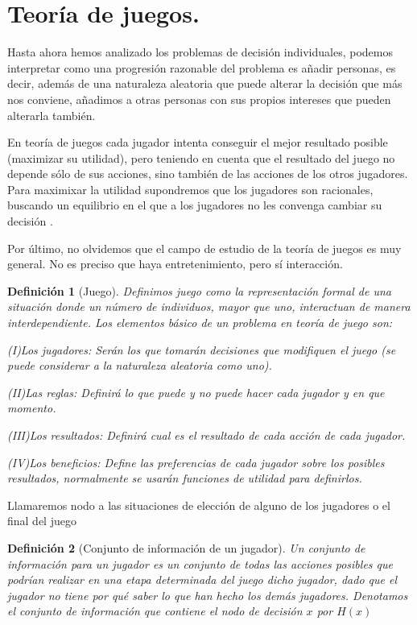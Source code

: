 \documentclass[a4paper]{report} %
\newtheorem{definicion}{Definición}[section]
\begin{document}
\section{Teoría de juegos.}


Hasta ahora hemos analizado los problemas de decisión individuales, podemos interpretar como una progresión razonable del problema es añadir personas, es decir, además de una naturaleza aleatoria que puede alterar la decisión que más nos conviene, añadimos a otras personas con sus propios intereses que pueden alterarla también.

En teoría de juegos cada jugador intenta conseguir el mejor resultado posible (maximizar su utilidad), pero teniendo en cuenta que el resultado del juego no depende sólo de sus acciones, sino también de las acciones de los otros jugadores. Para maximixar la utilidad supondremos que los jugadores son racionales, buscando un equilibrio en el que a los jugadores no les convenga cambiar su decisión .


Por último, no olvidemos que el campo de estudio de la teoría de juegos es muy general. No es preciso que haya entretenimiento, pero sí interacción.
\begin{definicion}[Juego]
Definimos juego como la representación formal de una situación donde un número de individuos, mayor que uno, interactuan de manera interdependiente.
Los elementos básico de un problema en teoría de juego son:

(I)Los jugadores: Serán los que tomarán decisiones que modifiquen el juego (se puede considerar a la naturaleza aleatoria como uno).

(II)Las reglas: Definirá lo que puede y no puede hacer cada jugador y en que momento.

(III)Los resultados: Definirá cual es el resultado de cada acción de cada jugador.

(IV)Los beneficios: Define las preferencias de cada jugador sobre los posibles resultados, normalmente se usarán funciones de utilidad para definirlos.

\end{definicion}


Llamaremos nodo a las situaciones de elección de alguno de los jugadores o el final del juego

\begin{definicion}[Conjunto de información de un jugador]
Un conjunto de información para un jugador es un conjunto de todas las acciones posibles que podrían realizar en una etapa determinada del juego dicho jugador, dado que el jugador no tiene por qué saber lo que han hecho los demás jugadores. Denotamos el conjunto de información que contiene el nodo de decisión $x$ por $H(x)$
\end{definicion}
\end{document}
